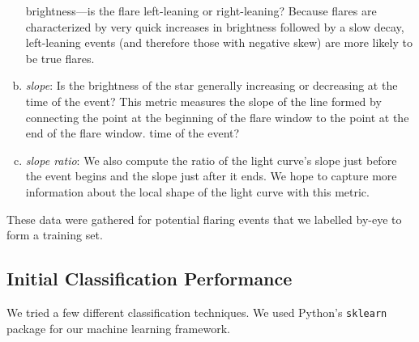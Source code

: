 \documentclass[11pt]{article}
\begin{document}
\begin{enumerate}[(a)]
  brightness---is the flare left-leaning or right-leaning?  Because
  flares are characterized by very quick increases in brightness
  followed by a slow decay, left-leaning events (and therefore those
  with negative skew) are more likely to be true flares.
\item \emph{slope}: Is the brightness of the star generally increasing
  or decreasing at the time of the event?  This metric measures the
  slope of the line formed by connecting the point at the beginning of
  the flare window to the point at the end of the flare window.
  time of the event?
\item \emph{slope ratio}: We also compute the ratio of the light
  curve's slope just before the event begins and the slope just after
  it ends.  We hope to capture more information about the local shape
  of the light curve with this metric.
\end{enumerate}
These data were gathered for potential flaring events that we labelled
by-eye to form a training set.

\subsection{Initial Classification Performance}
\label{sec:class}
We tried a few different classification techniques.  We used Python's
\verb|sklearn| package for our machine learning framework.
\end{document}

